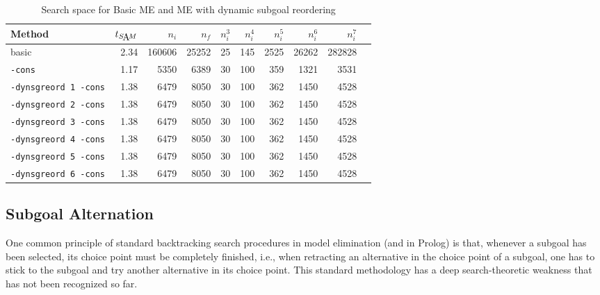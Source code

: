 \begin{table}[htb]
\begin{center}
\begin{tabular}{|l|r|r|r||r|r|r|r|r|r|}
\hline
Method & $t_{\SAM}$ & $n_i$ & $n_f$ & 
	$n_i^3$ & $n_i^4$ & $n_i^5$ & $n_i^6$ & $n_i^7$ \\
\hline\hline
basic & 2.34 & 160606 & 25252 &
	25 & 145 & 2525 & 26262 & 282828 \\
\hline
{\tt -cons} & 1.17 & 5350 & 6389 &
	30 & 100 & 359 & 1321 & 3531 \\
\hline
{\tt -dynsgreord 1 -cons} & 1.38 & 6479 & 8050 &
	30 & 100 & 362 & 1450 & 4528 \\
\hline
{\tt -dynsgreord 2 -cons} & 1.38 & 6479 & 8050 &
	30 & 100 & 362 & 1450 & 4528 \\
\hline
{\tt -dynsgreord 3 -cons} & 1.38 & 6479 & 8050 &
	30 & 100 & 362 & 1450 & 4528 \\
\hline
{\tt -dynsgreord 4 -cons} & 1.38 & 6479 & 8050 &
	30 & 100 & 362 & 1450 & 4528 \\
\hline
{\tt -dynsgreord 5 -cons} & 1.38 & 6479 & 8050 &
	30 & 100 & 362 & 1450 & 4528 \\
\hline
{\tt -dynsgreord 6 -cons} & 1.38 & 6479 & 8050 &
	30 & 100 & 362 & 1450 & 4528 \\
\hline\hline
\end{tabular}
\end{center}
\caption{Search space for Basic ME and ME with dynamic subgoal reordering} 
\label{tab:tut2:results.dynsgreord}
\end{table}


\subsection{Subgoal Alternation}

One common principle of standard backtracking search procedures in
model  elimination (and in Prolog) is that, whenever a subgoal has
been selected,  its choice point must be completely finished, i.e.,
when retracting an alternative in the choice point of a subgoal, one
has to stick to the subgoal and try another alternative in its choice
point. 
This standard methodology has a deep search-theoretic weakness that
has not been recognized so far.

